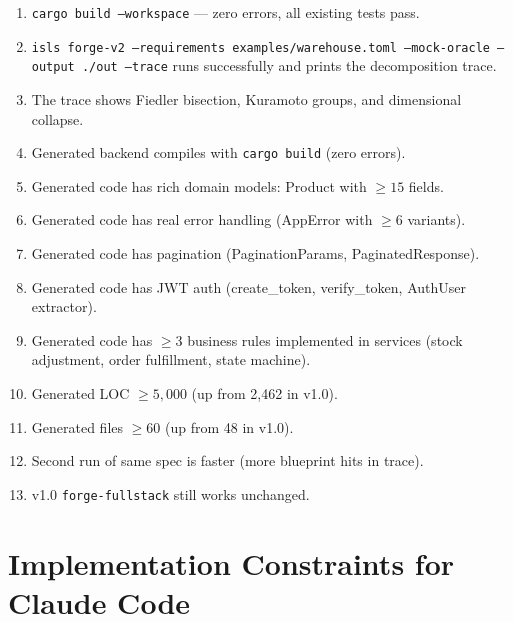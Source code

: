\documentclass[11pt,a4paper]{article}
\begin{document}
\begin{enumerate}
\item \texttt{cargo build --workspace} --- zero errors, all existing tests pass.
\item \texttt{isls forge-v2 --requirements examples/warehouse.toml --mock-oracle --output ./out --trace}
  runs successfully and prints the decomposition trace.
\item The trace shows Fiedler bisection, Kuramoto groups, and dimensional collapse.
\item Generated backend compiles with \texttt{cargo build} (zero errors).
\item Generated code has rich domain models: Product with $\geq 15$ fields.
\item Generated code has real error handling (AppError with $\geq 6$ variants).
\item Generated code has pagination (PaginationParams, PaginatedResponse).
\item Generated code has JWT auth (create\_token, verify\_token, AuthUser extractor).
\item Generated code has $\geq 3$ business rules implemented in services
  (stock adjustment, order fulfillment, state machine).
\item Generated LOC $\geq 5,000$ (up from 2,462 in v1.0).
\item Generated files $\geq 60$ (up from 48 in v1.0).
\item Second run of same spec is faster (more blueprint hits in trace).
\item v1.0 \texttt{forge-fullstack} still works unchanged.
\end{enumerate}

\section{Implementation Constraints for Claude Code}
\end{document}
